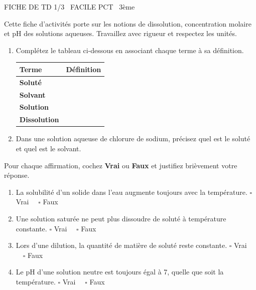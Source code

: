 \documentclass[11pt]{article}
\begin{document}
\begin{tcolorbox}[enhanced,colback=popink,colframe=popink,arc=10pt,boxrule=0pt,left=12pt,right=12pt,top=9pt,bottom=9pt]
{\color{white}\popxbold\small FICHE DE TD 1/3 \textbullet\ FACILE \hfill PCT \textbullet\ 3ème\par}
\end{tcolorbox}
\vspace{4pt}
\noindent Cette fiche d'activités porte sur les notions de dissolution, concentration molaire et pH des solutions aqueuses. Travaillez avec rigueur et respectez les unités.

\begin{exercice}
\label{exo:vocab}
\begin{enumerate}
    \item Complétez le tableau ci-dessous en associant chaque terme à sa définition.
    \begin{tabularx}{\linewidth}{>{\bfseries}l X}
        \toprule
        Terme & Définition \\
        \midrule
        Soluté & \\
        Solvant & \\
        Solution & \\
        Dissolution & \\
        \bottomrule
    \end{tabularx}
    \item Dans une solution aqueuse de chlorure de sodium, précisez quel est le soluté et quel est le solvant.
\end{enumerate}
\end{exercice}

\begin{exercice}
\label{exo:vf}
Pour chaque affirmation, cochez \textbf{Vrai} ou \textbf{Faux} et justifiez brièvement votre réponse.
\begin{enumerate}
    \item La solubilité d'un solide dans l'eau augmente toujours avec la température. \hfill $\square$ Vrai $\quad \square$ Faux
    \item Une solution saturée ne peut plus dissoudre de soluté à température constante. \hfill $\square$ Vrai $\quad \square$ Faux
    \item Lors d'une dilution, la quantité de matière de soluté reste constante. \hfill $\square$ Vrai $\quad \square$ Faux
    \item Le pH d'une solution neutre est toujours égal à 7, quelle que soit la température. \hfill $\square$ Vrai $\quad \square$ Faux
\end{enumerate}
\end{exercice}
\end{document}
